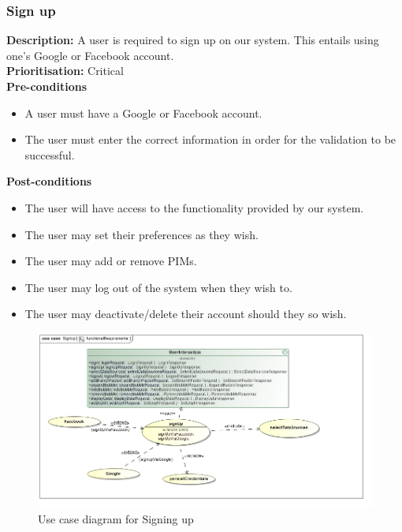 \documentclass[hidelinks,english]{article}
\begin{document}
			\subsubsection{Sign up}
				\textbf{Description:}  A user is required to sign up on our system. This entails using one's Google or Facebook account.\\
    			\textbf{Prioritisation:} Critical\\
      			\textbf{Pre-conditions}
    			\begin{itemize}
        			\item A user must have a Google or Facebook account.
        			\item The user must enter the correct information in order for the validation to be successful.
    			\end{itemize}
    			\textbf{Post-conditions}
     			\begin{itemize}
        			\item The user will have access to the functionality provided by our system.
        			\item The user may set their preferences as they wish.
        			\item The user may add or remove PIMs.
        			\item The user may log out of the system when they wish to.
        			\item The user may deactivate/delete their account should they so wish.
    			\end{itemize}
    			
    			\begin{figure}[!h]
    			\includegraphics[width=\linewidth]{functionalRequirementsSignUp.jpg}
    			\caption{Use case diagram for Signing up}
    			\label{UseCaseSignUp}
    			\end{figure}
    			
\end{document}

